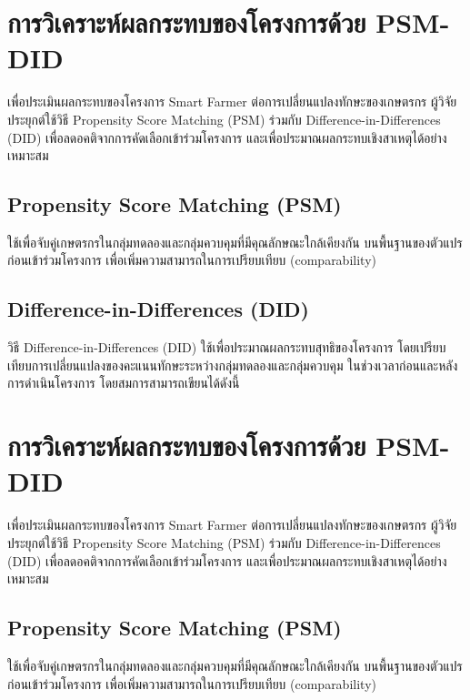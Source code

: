 
\section{การวิเคราะห์ผลกระทบของโครงการด้วย PSM-DID}

เพื่อประเมินผลกระทบของโครงการ Smart Farmer ต่อการเปลี่ยนแปลงทักษะของเกษตรกร 
ผู้วิจัยประยุกต์ใช้วิธี Propensity Score Matching (PSM) ร่วมกับ 
Difference-in-Differences (DID) เพื่อลดอคติจากการคัดเลือกเข้าร่วมโครงการ 
และเพื่อประมาณผลกระทบเชิงสาเหตุได้อย่างเหมาะสม


\subsection{Propensity Score Matching (PSM)}

ใช้เพื่อจับคู่เกษตรกรในกลุ่มทดลองและกลุ่มควบคุมที่มีคุณลักษณะใกล้เคียงกัน 
บนพื้นฐานของตัวแปรก่อนเข้าร่วมโครงการ เพื่อเพิ่มความสามารถในการเปรียบเทียบ (comparability)


\subsection{Difference-in-Differences (DID)}

วิธี Difference-in-Differences (DID) ใช้เพื่อประมาณผลกระทบสุทธิของโครงการ 
โดยเปรียบเทียบการเปลี่ยนแปลงของคะแนนทักษะระหว่างกลุ่มทดลองและกลุ่มควบคุม 
ในช่วงเวลาก่อนและหลังการดำเนินโครงการ โดยสมการสามารถเขียนได้ดังนี้

\section{การวิเคราะห์ผลกระทบของโครงการด้วย PSM-DID}

เพื่อประเมินผลกระทบของโครงการ Smart Farmer ต่อการเปลี่ยนแปลงทักษะของเกษตรกร 
ผู้วิจัยประยุกต์ใช้วิธี Propensity Score Matching (PSM) ร่วมกับ 
Difference-in-Differences (DID) เพื่อลดอคติจากการคัดเลือกเข้าร่วมโครงการ 
และเพื่อประมาณผลกระทบเชิงสาเหตุได้อย่างเหมาะสม


\subsection{Propensity Score Matching (PSM)}

ใช้เพื่อจับคู่เกษตรกรในกลุ่มทดลองและกลุ่มควบคุมที่มีคุณลักษณะใกล้เคียงกัน 
บนพื้นฐานของตัวแปรก่อนเข้าร่วมโครงการ เพื่อเพิ่มความสามารถในการเปรียบเทียบ (comparability)

